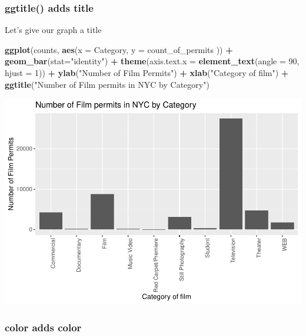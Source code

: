 \documentclass[
]{book}
\newenvironment{Shaded}{\begin{snugshade}}{\end{snugshade}}
\newcommand{\AttributeTok}[1]{\textcolor[rgb]{0.13,0.29,0.53}{#1}}
\newcommand{\DecValTok}[1]{\textcolor[rgb]{0.00,0.00,0.81}{#1}}
\newcommand{\FunctionTok}[1]{\textcolor[rgb]{0.13,0.29,0.53}{\textbf{#1}}}
\newcommand{\NormalTok}[1]{#1}
\newcommand{\SpecialCharTok}[1]{\textcolor[rgb]{0.81,0.36,0.00}{\textbf{#1}}}
\newcommand{\StringTok}[1]{\textcolor[rgb]{0.31,0.60,0.02}{#1}}
\begin{document}
\hypertarget{ggtitle-adds-title}{%
\subsubsection{ggtitle() adds title}\label{ggtitle-adds-title}}

Let's give our graph a title

\begin{Shaded}
\begin{Highlighting}[]
\FunctionTok{ggplot}\NormalTok{(counts, }\FunctionTok{aes}\NormalTok{(}\AttributeTok{x =}\NormalTok{ Category, }\AttributeTok{y =}\NormalTok{ count\_of\_permits )) }\SpecialCharTok{+}
  \FunctionTok{geom\_bar}\NormalTok{(}\AttributeTok{stat=}\StringTok{"identity"}\NormalTok{) }\SpecialCharTok{+} 
  \FunctionTok{theme}\NormalTok{(}\AttributeTok{axis.text.x =} \FunctionTok{element\_text}\NormalTok{(}\AttributeTok{angle =} \DecValTok{90}\NormalTok{, }\AttributeTok{hjust =} \DecValTok{1}\NormalTok{)) }\SpecialCharTok{+}
  \FunctionTok{ylab}\NormalTok{(}\StringTok{"Number of Film Permits"}\NormalTok{) }\SpecialCharTok{+} 
  \FunctionTok{xlab}\NormalTok{(}\StringTok{"Category of film"}\NormalTok{) }\SpecialCharTok{+}
  \FunctionTok{ggtitle}\NormalTok{(}\StringTok{"Number of Film permits in NYC by Category"}\NormalTok{)}
\end{Highlighting}
\end{Shaded}

\includegraphics{Statistics_Lab_files/figure-latex/1categoryE-1.pdf}

\hypertarget{color-adds-color}{%
\subsubsection{color adds color}\label{color-adds-color}}
\end{document}
